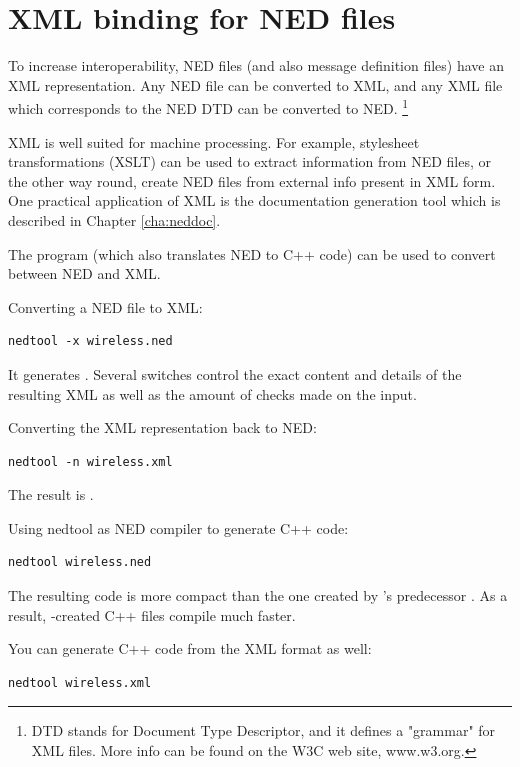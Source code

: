 \section{XML binding for NED files}

To increase interoperability, NED files (and also message definition files)
have an XML representation. Any NED file can be converted to XML, and
any XML file which corresponds to the NED DTD can be converted to NED.
  \footnote{DTD stands for Document Type Descriptor, and it defines
  a "grammar" for XML files. More info can be found on the W3C web site,
  www.w3.org.}

XML is well suited for machine processing. For example, stylesheet
transformations (XSLT) can be used to extract information from NED files,
or the other way round, create NED files from external info present in
XML form. One practical application of XML is the 
documentation generation tool which is described in Chapter \ref{cha:neddoc}.

The  program (which also translates NED to C++ code)
can be used to convert between NED and XML.

Converting a NED file to XML:

\begin{verbatim}
nedtool -x wireless.ned
\end{verbatim}

It generates .
Several switches control the exact content and details
of the resulting XML as well as the amount of checks
made on the input.

Converting the XML representation back to NED:

\begin{verbatim}
nedtool -n wireless.xml
\end{verbatim}

The result is .

Using nedtool as NED compiler to generate C++ code:

\begin{verbatim}
nedtool wireless.ned
\end{verbatim}

The resulting code is more compact than the
one created by 's predecessor .
As a result, -created 
C++ files compile much faster.

You can generate C++ code from the XML format as well:

\begin{verbatim}
nedtool wireless.xml
\end{verbatim}






